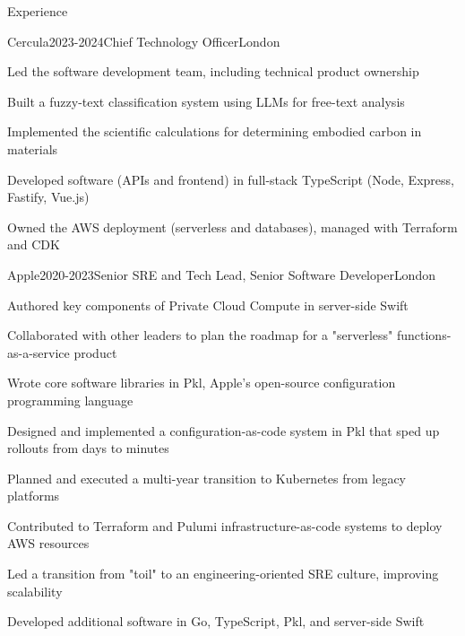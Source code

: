 \documentclass{resume} %
\begin{document}
\begin{rSection}{Experience}
\begin{rSubsection}{{Cercula}}{2023-2024}{Chief Technology Officer}{London}
    \item Led the software development team, including technical product ownership
    \item Built a fuzzy-text classification system using LLMs for free-text analysis
    \item Implemented the scientific calculations for determining embodied carbon in materials
    \item Developed software (APIs and frontend) in full-stack TypeScript (Node, Express, Fastify, Vue.js)
    \item Owned the AWS deployment (serverless and databases), managed with Terraform and CDK
\end{rSubsection}

\begin{rSubsection}{{Apple}}{2020-2023}{Senior SRE and Tech Lead, Senior Software Developer}{London}
    \item Authored key components of Private Cloud Compute in server-side Swift
    \item Collaborated with other leaders to plan the roadmap for a "serverless" functions-as-a-service product
    \item Wrote core software libraries in Pkl, Apple's open-source configuration programming language
    \item Designed and implemented a configuration-as-code system in Pkl that sped up rollouts from days to minutes
    \item Planned and executed a multi-year transition to Kubernetes from legacy platforms
    \item Contributed to Terraform and Pulumi infrastructure-as-code systems to deploy AWS resources
    \item Led a transition from "toil" to an engineering-oriented SRE culture, improving scalability
    \item Developed additional software in Go, TypeScript, Pkl, and server-side Swift
\end{rSubsection}


\end{rSection}
\end{document}

